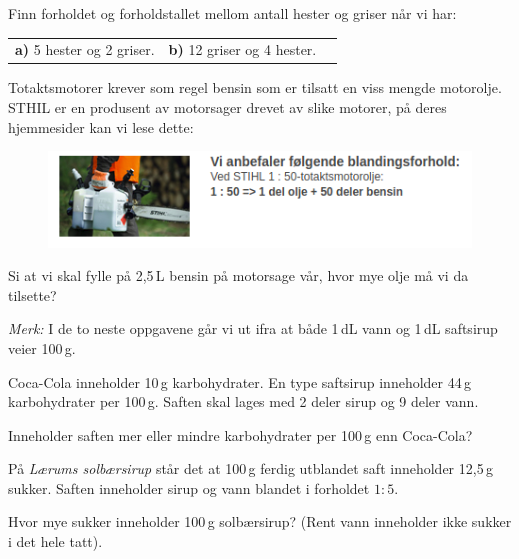 



\opgt

\nes
{}
Finn forholdet og forholdstallet mellom antall hester og griser når vi har:\os
\begin{tabular}{@{}l l l}	
\textbf{a)} 5 hester og 2 griser. &\textbf{b)} 12 griser og 4 hester.
\end{tabular}

Totaktsmotorer krever som regel bensin som er tilsatt en viss mengde motorolje. STHIL er en produsent av motorsager drevet av slike motorer, på deres hjemmesider kan vi lese dette:
\begin{figure}
	\includegraphics[]{stihl}
\end{figure}
Si at vi skal fylle på 2,5\,L bensin på motorsage vår, hvor mye olje må vi da tilsette?

\vsk \vspace{12pt}

\textsl{Merk:} I de to neste oppgavene går vi ut ifra at både 1\,dL vann og 1\,dL saftsirup veier 100\,g.

Coca-Cola inneholder 10\,g karbohydrater. En type saftsirup inneholder 44\,g karbohydrater per 100\,g. Saften skal lages med 2 deler sirup og 9 deler vann. \os

Inneholder saften mer eller mindre karbohydrater per 100\,g enn Coca-Cola?

På \textsl{Lærums solbærsirup} står det at 100\,g ferdig utblandet saft inneholder 12,5\,g sukker. Saften inneholder sirup og vann blandet i forholdet $ {1:5} $. \os

Hvor mye sukker inneholder 100\,g solbærsirup? (Rent vann inneholder ikke sukker i det hele tatt).



